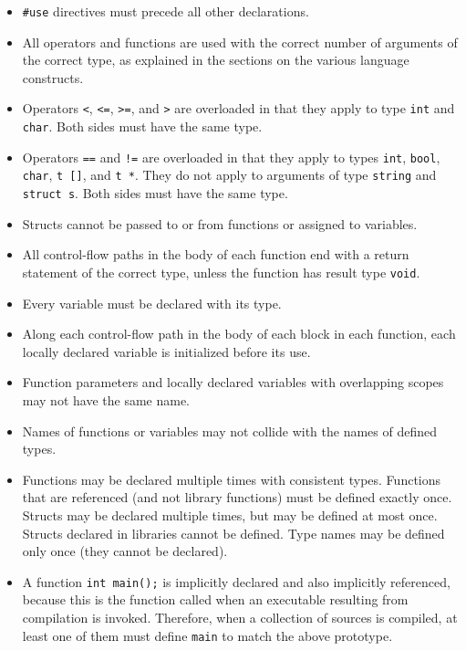 \documentclass[11pt]{article}
\begin{document}
\begin{itemize}
\item \lstinline'#use' directives must precede all other
  declarations.
\item All operators and functions are used with the
  correct number of arguments of the correct type,
  as explained in the sections on the various language
  constructs.
\item Operators \lstinline'<', \lstinline'<=', \lstinline'>=', and
  \lstinline'>' are overloaded in that they apply to
  type \lstinline'int' and \lstinline'char'.  Both sides must
  have the same type.
\item Operators \lstinline'==' and \lstinline'!=' are overloaded
  in that they apply to types \lstinline'int', \lstinline'bool',
  \lstinline'char', \lstinline't []', and \lstinline't *'.  They do
  not apply to arguments of type \lstinline'string' and
  \lstinline'struct s'.  Both sides must have the same type.
\item Structs cannot be passed to or from functions
  or assigned to variables.
\item All control-flow paths in the body of each function
  end with a return statement of the correct type,
  unless the function has result type \lstinline'void'.
\item Every variable must be declared with its type.
\item Along each control-flow path in the body of each
  block in each function, each locally declared variable
  is initialized before its use.
\item Function parameters and locally declared variables
  with overlapping scopes may not have the same name.
\item Names of functions or variables may not collide with the names
  of defined types.
\item Functions may be declared multiple times with consistent types.
  Functions that are referenced (and not library functions) must be
  defined exactly once.  Structs may be declared multiple times, but
  may be defined at most once.  Structs declared in libraries cannot
  be defined.  Type names may be defined only once (they cannot be
  declared).
\item A function \lstinline'int main();' is implicitly declared and
  also implicitly referenced, because this is the function called
  when an executable resulting from compilation is invoked.
  Therefore, when a collection of sources is compiled, at
  least one of them must define \lstinline'main' to match the
  above prototype.


\end{itemize}
\end{document}
